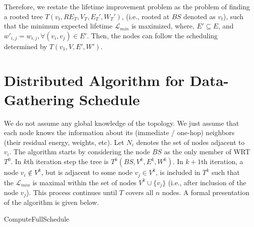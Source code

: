 \documentclass[10pt]{llncs}
\begin{document}
Therefore, we restate the lifetime improvement problem as the problem of finding a rooted tree $T(v_t, RE_T, V_T, E_T', W_T')$, (i.e., rooted at $BS$ denoted as $v_t$), such that the minimum expected lifetime $\mathcal{L}_{min}$ is maximized, where, $E' \subseteq E$, and $w'_{i,j} = w_{i,j}, \forall (v_i, v_j) \in E'$. Then, the nodes can follow the scheduling determined by $T(v_1, V, E', W')$.

\section{Distributed Algorithm for Data-Gathering Schedule}

We do not assume any global knowledge of the topology. We just assume that each node knows the information about its (immediate / one-hop) neighbors (their residual energy, weights, etc). Let $N_i$ denotes the set of nodes adjacent to $v_i$. The algorithm starts by considering the node $BS$ as the only member of WRT $T^0$. In $k$th iteration step the tree is $T^k(BS, V^k, E^k, W^k)$. In $k+1$th iteration, a node $v_i \not\in V^k$, but is adjacent to some node $v_j \in V^k$, is included in $T^k$ such that the $\mathcal{L}_{min}$ is maximal within the set of nodes $V^k \cup \{v_j\}$ (i.e., after inclusion of the node $v_j$). This process continues until $T$ covers all $n$ nodes. A formal presentation of the algorithm is given below.

\begin{algorithm}[htb]
\begin{algorithmic}
	\STATE{}
	\ENDIF
	\ENDIF
\ENDFOR
{}
	\ELSE
	\ENDIF
\ENDFOR
\STATE{}
\ENDIF
{}
\end{algorithmic}
\caption{ComputeFullSchedule} \label{algo:ComputeFullSchedule}
\end{algorithm}
\end{document}
